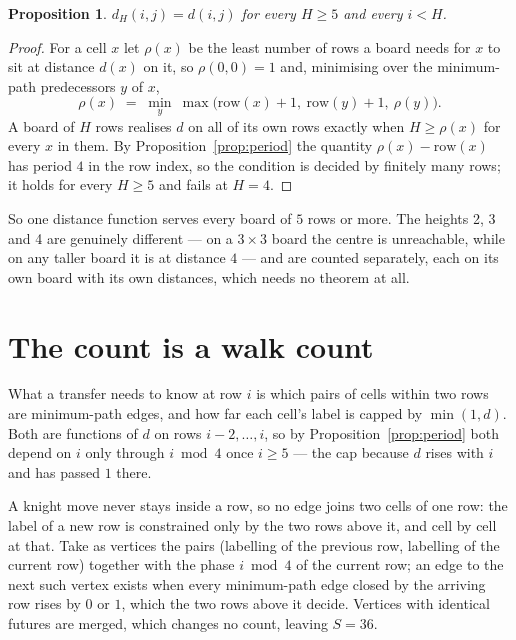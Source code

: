\documentclass[11pt,a4paper]{article}
\theoremstyle{plain}
\newtheorem{proposition}[theorem]{Proposition}
\theoremstyle{definition}
\begin{document}
\begin{proposition}\label{prop:height}
$d_H(i,j)=d(i,j)$ for every $H\ge5$ and every $i<H$.
\end{proposition}

\begin{proof}
For a cell $x$ let $\rho(x)$ be the least number of rows a board needs for $x$ to sit at distance $d(x)$ on it, so $\rho(0,0)=1$ and, minimising over the minimum-path predecessors $y$ of $x$,
\[ \rho(x)\;=\;\min_y\ \max\bigl(\mathrm{row}(x)+1,\ \mathrm{row}(y)+1,\ \rho(y)\bigr). \]
A board of $H$ rows realises $d$ on all of its own rows exactly when $H\ge\rho(x)$ for every $x$ in them. By Proposition~\ref{prop:period} the quantity $\rho(x)-\mathrm{row}(x)$ has period $4$ in the row index, so the condition is decided by finitely many rows; it holds for every $H\ge5$ and fails at $H=4$.
\end{proof}

So one distance function serves every board of $5$ rows or more. The heights 2, 3 and 4 are genuinely different --- on a $3\times3$ board the centre is unreachable, while on any taller board it is at distance $4$ --- and are counted separately, each on its own board with its own distances, which needs no theorem at all.

\section{The count is a walk count}

What a transfer needs to know at row $i$ is which pairs of cells within two rows are minimum-path edges, and how far each cell's label is capped by $\min(1,d)$. Both are functions of $d$ on rows $i-2,\dots,i$, so by Proposition~\ref{prop:period} both depend on $i$ only through $i\bmod 4$ once $i\ge5$ --- the cap because $d$ rises with $i$ and has passed $1$ there.

A knight move never stays inside a row, so no edge joins two cells of one row: the label of a new row is constrained only by the two rows above it, and cell by cell at that. Take as vertices the pairs (labelling of the previous row, labelling of the current row) together with the phase $i\bmod 4$ of the current row; an edge to the next such vertex exists when every minimum-path edge closed by the arriving row rises by $0$ or $1$, which the two rows above it decide. Vertices with identical futures are merged, which changes no count, leaving $S=36$.
\end{document}
